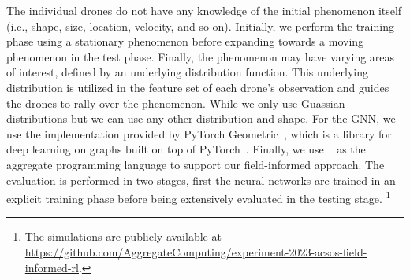  The individual drones do not have any knowledge of the initial phenomenon itself (i.e., shape, size, location, velocity, and so on).
Initially, 
  we perform the training phase using a stationary phenomenon before expanding towards a moving phenomenon in the test phase. 
  Finally, the phenomenon may have varying areas of interest, defined by an underlying distribution function. 
  This underlying distribution is utilized in the feature set of each drone's observation and guides the drones to rally over the phenomenon. 
  While we only use Guassian distributions but we can use any other distribution and shape. 
For the \ac{GNN}, we use the implementation provided by PyTorch Geometric~\cite{Fey/Lenssen/2019}, 
 which is a library for deep learning on graphs built on top of PyTorch~\cite{torch}.
Finally, we use \scafi{}~\cite{casadei2022scafi} as the aggregate programming language to support our field-informed approach.
%
The evaluation is performed in two stages, 
 first the neural networks are trained in an explicit training phase before being extensively evaluated in the testing stage.
\footnote{The simulations are publicly available at \url{https://github.com/AggregateComputing/experiment-2023-acsos-field-informed-rl}.}
